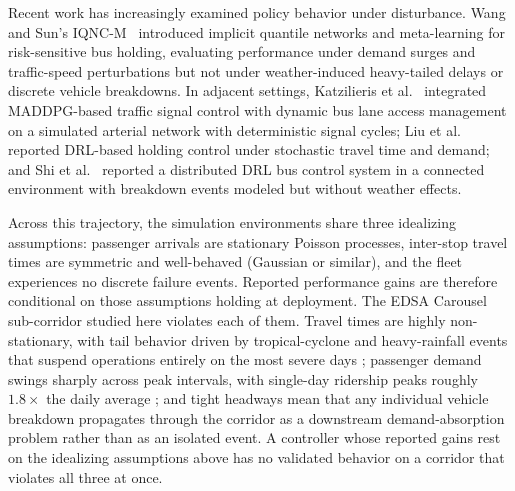 Recent work has increasingly examined policy behavior under disturbance. Wang and Sun's IQNC-M~\cite{Wangsun} introduced implicit quantile networks and meta-learning for risk-sensitive bus holding, evaluating performance under demand surges and traffic-speed perturbations but not under weather-induced heavy-tailed delays or discrete vehicle breakdowns. In adjacent settings, Katzilieris et al.~\cite{Katzilieris2026MARL} integrated MADDPG-based traffic signal control with dynamic bus lane access management on a simulated arterial network with deterministic signal cycles; Liu et al.~\cite{Liu2023DRLHolding} reported DRL-based holding control under stochastic travel time and demand; and Shi et al.~\cite{Shi2022DistDRL} reported a distributed DRL bus control system in a connected environment with breakdown events modeled but without weather effects.

Across this trajectory, the simulation environments share three idealizing assumptions: passenger arrivals are stationary Poisson processes, inter-stop travel times are symmetric and well-behaved (Gaussian or similar), and the fleet experiences no discrete failure events. Reported performance gains are therefore conditional on those assumptions holding at deployment. The EDSA Carousel sub-corridor studied here violates each of them. Travel times are highly non-stationary, with tail behavior driven by tropical-cyclone and heavy-rainfall events that suspend operations entirely on the most severe days \cite{DOTr2020Suspension}; passenger demand swings sharply across peak intervals, with single-day ridership peaks roughly $1.8\times$ the daily average \cite{DOTr2025Ridership}; and tight headways mean that any individual vehicle breakdown propagates through the corridor as a downstream demand-absorption problem rather than as an isolated event. A controller whose reported gains rest on the idealizing assumptions above has no validated behavior on a corridor that violates all three at once.

